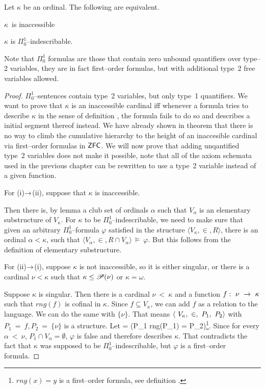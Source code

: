 \begin{theorem}
Let $\kappa$ be an ordinal. The following are equivalent.
\bce[(i)]
\item $\kappa$ is inaccessible
\item $\kappa$ is $\Pi^1_0$–indescribable.
\ece
\end{theorem}

Note that $\Pi^1_0$ formulas are those that contain zero unbound quantifiers over type–2 variables, they are in fact first–order formulas, but with additional type~2 free variables allowed.

\begin{proof}
$\Pi^1_0$–sentences contain type~2 variables, but only type~1 quantifiers. We want to prove that $\kappa$ is an inaccessible cardinal iff whenever a formula tries to describe $\kappa$ in the sense of definition , the formula fails to do so and describes a initial segment thereof instead.
We have already shown in theorem  that there is no way to climb the cumulative hierarchy to the height of an inaccesible cardinal via first–order formulas in $\sf{ZFC}$. We will now prove that adding unqantified type~2 variables does not make it possible, note that all of the axiom schemata used in the previous chapter can be rewritten to use a type~2 variable instead of a given function.

For (i)$\rightarrow$(ii), suppose that $\kappa$ is inaccessible.

Then there is, by lemma  a club set of ordinals $\alpha$ such that $V_\alpha$ is an elementary substructure of $V_\kappa$. 
For $\kappa$ to be $\Pi^1_0$–indescribable, we need to make sure that given an arbitrary $\Pi^1_0$–formula $\varphi$ satisfied in the structure $\langle V_\kappa, \in, R \rangle$, there is an ordinal $\alpha < \kappa$, such that $\langle V_\alpha, \in, R \cap V_\alpha \rangle~\models~\varphi$. But this follows from the definition of elementary substructure.

For (ii)$\rightarrow$(i), suppose $\kappa$ is not inaccessible, so it is either singular, or there is a cardinal $\nu < \kappa$ such that $\kappa \leq \mathscr{P} (\nu)$ or $\kappa=\omega$. 


Suppose $\kappa$ is singular. Then there is a cardinal $\nu~<~\kappa$ and a function $f:~\nu~\rightarrow~\kappa$ such that $rng(f)$ is cofinal in $\kappa$. Since $f \subseteq V_\kappa$, we can add $f$ as a relation to the language. We can do the same with $\{\nu\}$. That means $\langle~V_\kappa,~\in,~P_1,~P_2\rangle$ with $P_1~=~f, P_2~=~\{\nu\}$ is a structure.
Let 
\beq
\varphi = (P_1 \neq \emptyset \et rng(P_1) = P_2)\footnote{$rng(x)=y$ is a first–order formula, see definition .}\mbox{.}
\eeq
Since for every $\alpha~<~\nu$, $P_1 \cap V_\alpha = \emptyset$, $\varphi$ is false and therefore describes $\kappa$. That contradicts the fact that $\kappa$ was supposed to be $\Pi^1_0$–indescribable, but $\varphi$ is a first–order formula.


\end{proof}
